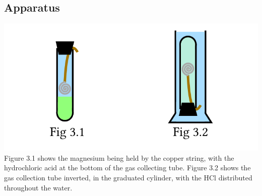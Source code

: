 \documentclass[11pt]{article}
\begin{document}
\subsection{Apparatus}
\includegraphics[width=\textwidth]{Apparatus}
Figure 3.1 shows the magnesium being held by the copper string, with the hydrochloric acid at the bottom of the gas collecting tube. Figure 3.2 shows the gas collection tube inverted, in the graduated cylinder, with the HCl distributed throughout the water. 
\end{document}
